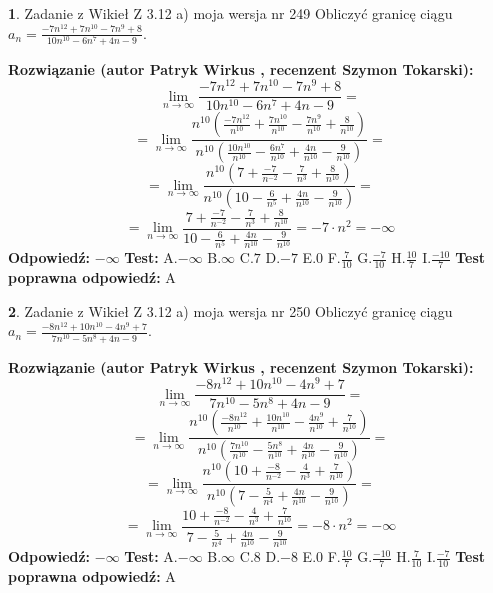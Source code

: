 \documentclass[12pt, a4paper]{article}
\theoremstyle{definition} %
\newtheorem{zad}{}
\newcommand{\zadStart}[1]{\begin{zad}#1\newline}
\newcommand{\zadStop}{\end{zad}}
\newcommand{\rozwStart}[2]{\noindent \textbf{Rozwiązanie (autor #1 , recenzent #2): }\newline}
\newcommand{\rozwStop}{\newline}
\newcommand{\odpStart}{\noindent \textbf{Odpowiedź:}\newline}
\newcommand{\odpStop}{\newline}
\newcommand{\testStart}{\noindent \textbf{Test:}\newline}
\newcommand{\testStop}{\newline}
\newcommand{\kluczStart}{\noindent \textbf{Test poprawna odpowiedź:}\newline}
\newcommand{\kluczStop}{\newline}
\begin{document}
\zadStart{Zadanie z Wikieł Z 3.12 a) moja wersja nr 249}
Obliczyć granicę ciągu $a_{n}=\frac{-7n^{12}+7n^{10}-7n^{9}+8}{10n^{10}-6n^{7}+4n-9}$.
\zadStop
\rozwStart{Patryk Wirkus}{Szymon Tokarski}
$$\lim\limits_{n\to\infty}\frac{-7n^{12}+7n^{10}-7n^{9}+8}{10n^{10}-6n^{7}+4n-9}=$$
$$=\lim\limits_{n\to\infty}\frac{n^{10}\left(\frac{-7n^{12}}{n^{10}}+\frac{7n^{10}}{n^{10}}-\frac{7n^{9}}{n^{10}}+\frac{8}{n^{10}}\right)}{n^{10}\left(\frac{10n^{10}}{n^{10}}-\frac{6n^{7}}{n^{10}}+\frac{4n}{n^{10}}-\frac{9}{n^{10}}\right)}=$$
$$=\lim\limits_{n\to\infty}\frac{n^{10}\left(7+\frac{-7}{n^{-2}}-\frac{7}{n^{3}}+\frac{8}{n^{10}}\right)}
{n^{10}\left(10-\frac{6}{n^{5}}+\frac{4n}{n^{10}}-\frac{9}{n^{10}}\right)}=$$
$$=\lim\limits_{n\to\infty}\frac{7+\frac{-7}{n^{-2}}-\frac{7}{n^{3}}+\frac{8}{n^{10}}}{10-\frac{6}{n^{5}}+\frac{4n}{n^{10}}-\frac{9}{n^{10}}}=-7\cdot n^{2} = -\infty$$
\rozwStop
\odpStart
$-\infty$
\odpStop
\testStart
A.$-\infty$
B.$\infty$
C.$7$
D.$-7$
E.$0$
F.$\frac{7}{10}$
G.$\frac{-7}{10}$
H.$\frac{10}{7}$
I.$\frac{-10}{7}$
\testStop
\kluczStart
A
\kluczStop



\zadStart{Zadanie z Wikieł Z 3.12 a) moja wersja nr 250}
Obliczyć granicę ciągu $a_{n}=\frac{-8n^{12}+10n^{10}-4n^{9}+7}{7n^{10}-5n^{8}+4n-9}$.
\zadStop
\rozwStart{Patryk Wirkus}{Szymon Tokarski}
$$\lim\limits_{n\to\infty}\frac{-8n^{12}+10n^{10}-4n^{9}+7}{7n^{10}-5n^{8}+4n-9}=$$
$$=\lim\limits_{n\to\infty}\frac{n^{10}\left(\frac{-8n^{12}}{n^{10}}+\frac{10n^{10}}{n^{10}}-\frac{4n^{9}}{n^{10}}+\frac{7}{n^{10}}\right)}{n^{10}\left(\frac{7n^{10}}{n^{10}}-\frac{5n^{8}}{n^{10}}+\frac{4n}{n^{10}}-\frac{9}{n^{10}}\right)}=$$
$$=\lim\limits_{n\to\infty}\frac{n^{10}\left(10+\frac{-8}{n^{-2}}-\frac{4}{n^{3}}+\frac{7}{n^{10}}\right)}
{n^{10}\left(7-\frac{5}{n^{4}}+\frac{4n}{n^{10}}-\frac{9}{n^{10}}\right)}=$$
$$=\lim\limits_{n\to\infty}\frac{10+\frac{-8}{n^{-2}}-\frac{4}{n^{3}}+\frac{7}{n^{10}}}{7-\frac{5}{n^{4}}+\frac{4n}{n^{10}}-\frac{9}{n^{10}}}=-8\cdot n^{2} = -\infty$$
\rozwStop
\odpStart
$-\infty$
\odpStop
\testStart
A.$-\infty$
B.$\infty$
C.$8$
D.$-8$
E.$0$
F.$\frac{10}{7}$
G.$\frac{-10}{7}$
H.$\frac{7}{10}$
I.$\frac{-7}{10}$
\testStop
\kluczStart
A
\kluczStop
\end{document}
